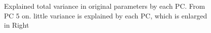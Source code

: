 \begin{figure}[H]
    \begin{center}
    \end{center}

    \caption[Explained total variance in original parameters by each PC]{Explained total variance in original parameters by each PC. From PC 5 on. little variance is explained by each PC, which is enlarged in Right}
    \label{fig:pc}
\end{figure}

